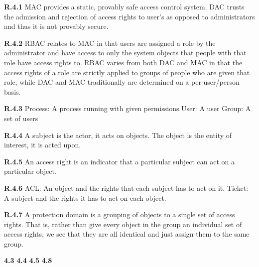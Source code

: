 {\bf R.4.1} MAC provides a static, provably safe access control system. DAC
trusts the admission and rejection of access rights to user's as opposed to
administrators and thus it is not provably secure.

{\bf R.4.2} RBAC relates to MAC in that users are assigned a role by the
administrator and have access to only the system objects that people with that
role have access rights to. RBAC varies from both DAC and MAC in that the access
rights of a role are strictly applied to groups of people who are given that
role, while DAC and MAC traditionally are determined on a per-user/person basis.

{\bf R.4.3} 
Process: A process running with given permissions
User: A user
Group: A set of users

{\bf R.4.4} A subject is the actor, it acts on objects. The object is the entity
of interest, it is acted upon.

{\bf R.4.5} An access right is an indicator that a particular subject can act on
a particular object.

{\bf R.4.6}
ACL: An object and the rights that each subject has to act on it.
Ticket: A subject and the rights it has to act on each object.

{\bf R.4.7}
A protection domain is a grouping of objects to a single set of access rights.
That is, rather than give every object in the group an individual set of access
rights, we see that they are all identical and just assign them to the same
group.

{\bf 4.3}
{\bf 4.4}
{\bf 4.5}
{\bf 4.8}

